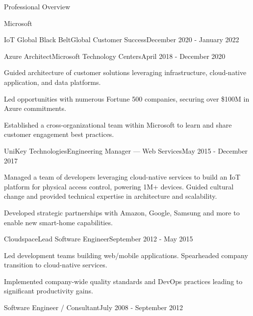 \documentclass{resume} %
\begin{document}
\begin{rSection}{Professional Overview}
\begin{rCompany}{Microsoft}{}{}
\begin{rSubSubsection}{IoT Global Black Belt}{Global Customer Success}{December 2020 - January 2022}
    \end{rSubSubsection}

    \begin{rSubSubsection}{Azure Architect}{Microsoft Technology Centers}{April 2018 - December 2020}
        
      \item Guided architecture of customer solutions leveraging infrastructure, cloud-native application, and data platforms.
      \item Led opportunities with numerous Fortune 500 companies, securing over \$100M in Azure commitments.
      \item Established a cross-organizational team within Microsoft to learn and share customer engagement best practices.
      
    \end{rSubSubsection}

  \end{rCompany}
  
  
  \begin{rNewRole}{UniKey Technologies}{Engineering Manager --- Web Services}{May 2015 - December 2017}
    
    \item Managed a team of developers leveraging cloud-native services to build an IoT platform for physical access control, powering 1M+ devices.  Guided cultural change and provided technical expertise in architecture and scalability.
    \item Developed strategic partnerships with Amazon, Google, Samsung and more to enable new smart-home capabilities.
    
  \end{rNewRole}
  
  
  \begin{rNewRole}{Cloudspace}{Lead Software Engineer}{September 2012 - May 2015}
    
    \item Led development teams building web/mobile applications. Spearheaded company transition to cloud-native services.
    \item Implemented company-wide quality standards and DevOps practices leading to significant productivity gains.
    
  \end{rNewRole}
  
  
  \begin{rCompany}{Software Engineer / Consultant}{July 2008 - September 2012}{}

  \end{rCompany}
  
  
  
\end{rSection}
\end{document}

